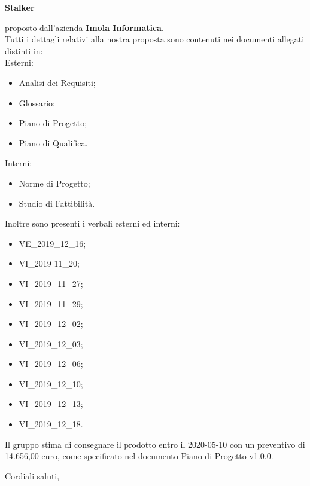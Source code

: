 \documentclass[12pt]{letter}
\begin{document}
\begin{letter}
\begin{center}
            \textbf{Stalker}
        \end{center}
        proposto dall'azienda \textbf{Imola Informatica}.\\
        Tutti i dettagli relativi alla nostra proposta sono contenuti nei documenti allegati distinti in: \\
        Esterni: 
        \begin{itemize}
            \item Analisi dei Requisiti;
            \item Glossario;
            \item Piano di Progetto;
            \item Piano di Qualifica.
        \end{itemize}
        Interni:
        \begin{itemize}
            \item Norme di Progetto;
            \item Studio di Fattibilità.
        \end{itemize}
        Inoltre sono presenti i verbali esterni ed interni:
        \begin{itemize}
            \item VE\_2019\_12\_16;
            \item VI\_2019 11\_20;
            \item VI\_2019\_11\_27;
            \item VI\_2019\_11\_29;
            \item VI\_2019\_12\_02;
            \item VI\_2019\_12\_03;
            \item VI\_2019\_12\_06;
            \item VI\_2019\_12\_10;
            \item VI\_2019\_12\_13;
            \item VI\_2019\_12\_18.
        \end{itemize}
        Il gruppo stima di consegnare il prodotto entro il 2020-05-10 con un preventivo di 14.656,00 euro, come specificato nel documento Piano di Progetto v1.0.0.
        \closing{Cordiali saluti,}
        \vspace{10mm}
    \end{letter}
\end{document}
